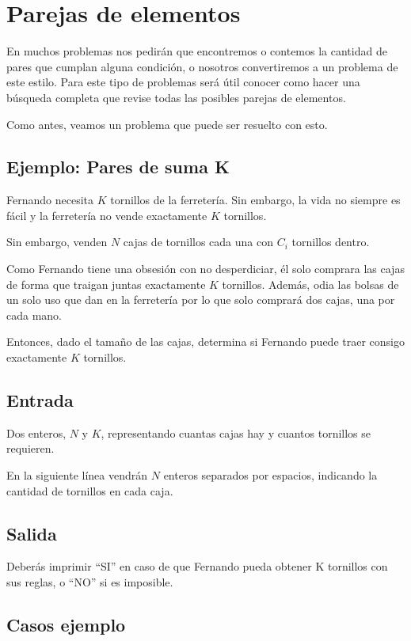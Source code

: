 \section{Parejas de elementos}


En muchos problemas nos pedirán que encontremos o contemos la cantidad de pares que cumplan alguna condición, o nosotros convertiremos a un problema de este estilo. Para este tipo de problemas será útil conocer como hacer una búsqueda completa que revise todas las posibles parejas de elementos.

Como antes, veamos un problema que puede ser resuelto con esto.

\subsection*{Ejemplo: Pares de suma K}

Fernando necesita \(K\) tornillos de la ferretería. Sin embargo, la vida no siempre es fácil y la ferretería no vende exactamente \(K\) tornillos.

Sin embargo, venden \(N\) cajas de tornillos cada una con \(C_i\) tornillos dentro. 

Como Fernando tiene una obsesión con no desperdiciar, él solo comprara las cajas de forma que traigan juntas exactamente \(K\) tornillos. Además, odia las bolsas de un solo uso que dan en la ferretería por lo que solo comprará dos cajas, una por cada mano.

Entonces, dado el tamaño de las cajas, determina si Fernando puede traer consigo exactamente \(K\) tornillos.

\subsection*{Entrada}
Dos enteros, \(N\) y \(K\), representando cuantas cajas hay y cuantos tornillos se requieren.

En la siguiente línea vendrán \(N\) enteros separados por espacios, indicando la cantidad de tornillos en cada caja.

\subsection*{Salida}
Deberás imprimir “SI” en caso de que Fernando pueda obtener K tornillos con sus reglas, o “NO” si es imposible.

\subsection*{Casos ejemplo}

